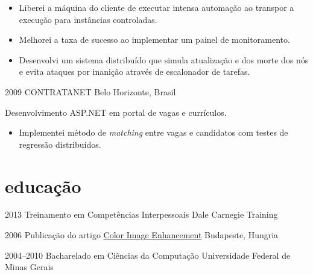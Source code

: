 \documentclass[]{friggeri-cv}
\begin{document}
\begin{entrylist}
{  \begin{itemize}
    \item Liberei a máquina do cliente de executar intensa automação ao transpor a execução para instâncias controladas.
    \item Melhorei a taxa de sucesso ao implementar um painel de monitoramento.
    \item Desenvolvi um sistema distribuído que simula atualização e dos morte dos nós e evita ataques por inanição através de escalonador de tarefas.
  \end{itemize}
}

\entry
{2009}
{CONTRATANET}
{Belo Horizonte, Brasil}
{ Desenvolvimento ASP.NET em portal de vagas e currículos.
\begin{itemize}
  \item Implementei método de \textit{matching} entre vagas e candidatos com testes de regressão distribuídos.
  \end{itemize}
}

\end{entrylist}

\section{educação}
\begin{entrylist}
	\entry
	{2013}
	{{Treinamento em} Competências Interpessoais}
	{Dale Carnegie Training}
	
	\entry
	{2006}
	{{Publicação do artigo}  \href{http://goo.gl/iwGso6}{Color Image Enhancement}}
	{Budapeste, Hungria}

	\entry
	{2004--2010}
	{{\normalfont Bacharelado em} Ciências da Computação}
	{Universidade Federal de Minas Gerais}
	
\end{entrylist}
\end{document}
